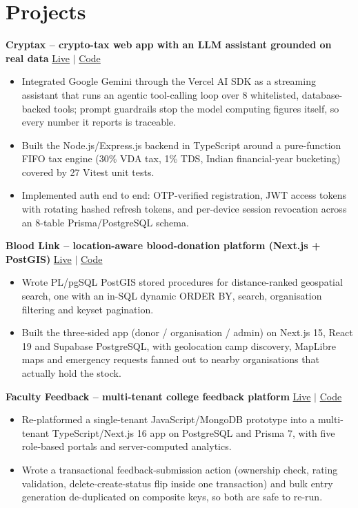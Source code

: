 \documentclass[letterpaper,10.5pt]{article}
\newcommand{\EntryLine}[2]{\textbf{#1} \hfill {\small #2}\par\vspace{-1pt}}
\newenvironment{Bullets}
  {\begin{itemize}[leftmargin=1.15em,itemsep=1pt,parsep=0pt,topsep=2pt]\small}
  {\end{itemize}\vspace{3pt}}
\begin{document}
\section{Projects}
\EntryLine{Cryptax -- crypto-tax web app with an LLM assistant grounded on real data}{\href{https://cryp1ax.vercel.app}{Live} $|$ \href{https://github.com/Agent-Gautam/buddy-backend}{Code}}
\begin{Bullets}
  \item Integrated Google Gemini through the Vercel AI SDK as a streaming assistant that runs an agentic tool-calling loop over 8 whitelisted, database-backed tools; prompt guardrails stop the model computing figures itself, so every number it reports is traceable.
  \item Built the Node.js/Express.js backend in TypeScript around a pure-function FIFO tax engine (30\% VDA tax, 1\% TDS, Indian financial-year bucketing) covered by 27 Vitest unit tests.
  \item Implemented auth end to end: OTP-verified registration, JWT access tokens with rotating hashed refresh tokens, and per-device session revocation across an 8-table Prisma/PostgreSQL schema.
\end{Bullets}

\EntryLine{Blood Link -- location-aware blood-donation platform (Next.js + PostGIS)}{\href{https://blood-link2.vercel.app}{Live} $|$ \href{https://github.com/Agent-Gautam/blood-link-supabase}{Code}}
\begin{Bullets}
  \item Wrote PL/pgSQL PostGIS stored procedures for distance-ranked geospatial search, one with an in-SQL dynamic ORDER BY, search, organisation filtering and keyset pagination.
  \item Built the three-sided app (donor / organisation / admin) on Next.js 15, React 19 and Supabase PostgreSQL, with geolocation camp discovery, MapLibre maps and emergency requests fanned out to nearby organisations that actually hold the stock.
\end{Bullets}

\EntryLine{Faculty Feedback -- multi-tenant college feedback platform}{\href{https://give-feedback.vercel.app}{Live} $|$ \href{https://github.com/Agent-Gautam/faculty-feedback-refactor}{Code}}
\begin{Bullets}
  \item Re-platformed a single-tenant JavaScript/MongoDB prototype into a multi-tenant TypeScript/Next.js 16 app on PostgreSQL and Prisma 7, with five role-based portals and server-computed analytics.
  \item Wrote a transactional feedback-submission action (ownership check, rating validation, delete-create-status flip inside one transaction) and bulk entry generation de-duplicated on composite keys, so both are safe to re-run.
\end{Bullets}
\end{document}
